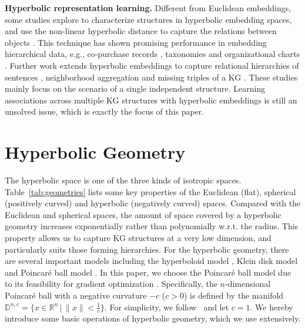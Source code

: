 \documentclass[11pt,a4paper]{article}
\begin{document}
\noindent\textbf{Hyperbolic representation learning.}
Different from Euclidean embeddings, some studies explore to characterize structures in hyperbolic embedding spaces, and use the non-linear hyperbolic distance to capture the relations between objects \cite{NickelK17,sala2018representation}. This technique has shown promising performance in embedding hierarchical data, e.g., co-purchase records \cite{vinh2018hyperbolic}, taxonomies \cite{le2019inferring,aly2019every} and organizational charts \cite{chen2019edge}. Further work extends hyperbolic embeddings to capture relational hierarchies of sentences \cite{HyperText}, neighborhood aggregation \cite{HGCNN,HGCN} and missing triples of a KG \cite{HyperKG,PoincareKG}. These studies mainly focus on the scenario of a single independent structure. Learning associations across multiple KG structures with hyperbolic embeddings is still an unsolved issue, which is exactly the focus of this paper.
 \section{Hyperbolic Geometry}


The hyperbolic space is one of the three kinds of isotropic spaces. Table~\ref{tab:geometries} lists some key properties of the Euclidean (flat), spherical (positively curved) and hyperbolic (negatively curved) spaces. Compared with the Euclidean and spherical spaces, the amount of space covered by a hyperbolic geometry increases exponentially rather than polynomially w.r.t. the radius. This property allows us to capture KG structures at a very low dimension, and particularly suits those forming hierarchies. For the hyperbolic geometry, there are several important models including the hyperboloid model \cite{reynolds1993hyperbolic}, Klein disk model \cite{nielsen2014visualizing} and Poincar\'e ball model \cite{cannon1997hyperbolic}. In this paper, we choose the Poincar\'e ball model due to its feasibility for gradient optimization \cite{PoincareKG}. Specifically, the $n$-dimensional Poincar\'e ball with a negative curvature $-c$ ($c>0$) is defined by the manifold $\mathbb{D}^{n,c}=\{x\in \mathbb{R}^n\,|\,\|x\| < \frac{1}{c}\}$. For simplicity, we follow~\cite{HNN} and let $c=1$. We hereby introduce some basic operations of hyperbolic geometry, which we use extensively.
\end{document}
